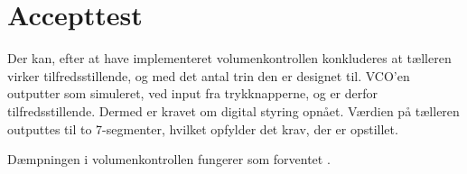 \section{Accepttest}
\label{volumenkontrol-accepttest}
Der kan, efter at have implementeret volumenkontrollen konkluderes at tælleren virker tilfredsstillende, og med det antal trin den er designet til. VCO'en outputter som simuleret, ved input fra trykknapperne, og er derfor tilfredsstillende. Dermed er kravet om digital styring opnået. Værdien på tælleren outputtes til to 7-segmenter, hvilket opfylder det krav, der er opstillet.

Dæmpningen i volumenkontrollen fungerer som forventet . 

